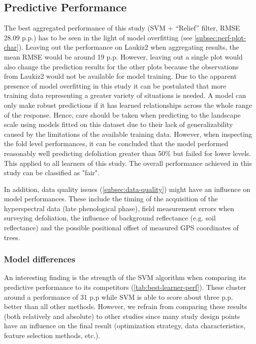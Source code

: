 \documentclass[final]{IEEEtran}
\begin{document}
\subsection{Predictive Performance}

The best aggregated performance of this study (SVM + \enquote{Relief} filter, RMSE 28.09 p.p.) has to be seen in the light of model overfitting (see \autoref{subsec:perf-plot-char}).
Leaving out the performance on Laukiz2 when aggregating results, the mean RMSE would be around 19 p.p.
However, leaving out a single plot would also change the prediction results for the other plots because the observations from Laukiz2 would not be available for model training.
Due to the apparent presence of model overfitting in this study it can be postulated that more training data representing a greater variety of situations is needed.
A model can only make robust predictions if it has learned relationships across the whole range of the response.
Hence, care should be taken when predicting to the landscape scale using models fitted on this dataset due to their lack of generalizability caused by the limitations of the available training data.
However, when inspecting the fold level performances, it can be concluded that the model performed reasonably well predicting defoliation greater than 50\% but failed for lower levels.
This applied to all learners of this study.
The overall performance achieved in this study can be classified as "fair".

In addition, data quality issues (\autoref{subsec:data-quality}) might have an influence on model performances.
These include the timing of the acquisition of the hyperspectral data (late phenological phase), field measurement errors when surveying defoliation, the influence of background reflectance (e.g. soil reflectance) and the possible positional offset of measured GPS coordinates of trees.

\subsubsection{Model differences}

An interesting finding is the strength of the SVM algorithm when comparing its predictive performance to its competitors (\autoref{tab:best-learner-perf}).
These cluster around a performance of 31 p.p while SVM is able to score about three p.p. better than all other methods.
However, we refrain from comparing these results (both relatively and absolute) to other studies since many study design points have an influence on the final result (optimization strategy, data characteristics, feature selection methods, etc.).
\end{document}
